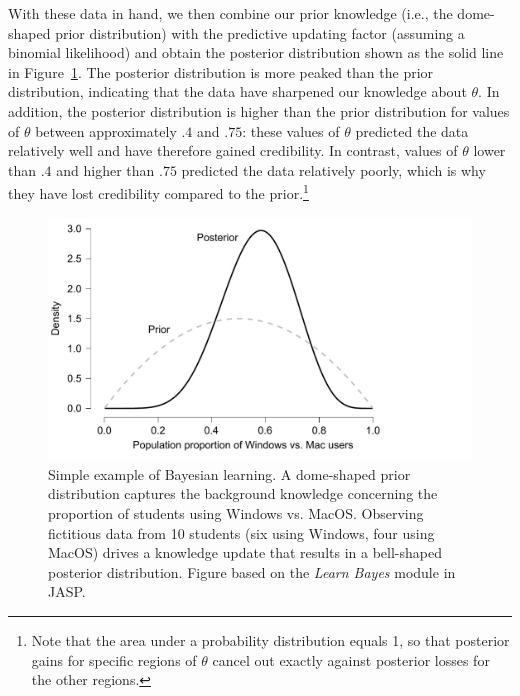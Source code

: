 \documentclass[man]{apa7}
\begin{document}
With these data in hand, we then combine our prior knowledge (i.e., the dome-shaped prior distribution) with the predictive updating factor (assuming a binomial likelihood) and obtain the posterior distribution shown as the solid line in Figure~\ref{fig:WindowsMacPriorPosterior}. The posterior distribution is more peaked than the prior distribution, indicating that the data have sharpened our knowledge about $\theta$. In addition, the posterior distribution is higher than the prior distribution for values of $\theta$ between approximately $.4$ and $.75$: these values of $\theta$ predicted the data relatively well and have therefore gained credibility. In contrast, values of $\theta$ lower than $.4$ and higher than $.75$ predicted the data relatively poorly, which is why they have lost credibility compared to the prior.\footnote{Note that the area under a probability distribution equals 1, so that posterior gains for specific regions of $\theta$ cancel out exactly against posterior losses for the other regions.} 

\begin{figure}[h]
\begin{center}
\includegraphics[width = .785\paperwidth]{WindowsMacPriorPosterior.pdf}
\caption{Simple example of Bayesian learning. A dome-shaped prior distribution captures the background knowledge concerning the proportion of students using Windows vs. MacOS. Observing fictitious data from 10 students (six using Windows, four using MacOS) drives a knowledge update that results in a bell-shaped posterior distribution. Figure based on the \emph{Learn Bayes} module in JASP.}
\label{fig:WindowsMacPriorPosterior}
\end{center}
\end{figure}
\end{document}
